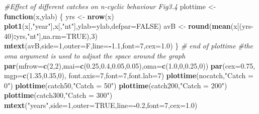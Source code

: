 \documentclass[
  lang=cn,
  11pt,
  scheme=chinese,
  chinesefont=nofont,
  citestyle=gb7714-2015,
  bibstyle=gb7714-2015]{elegantbook}
\newenvironment{Shaded}{\begin{snugshade}}{\end{snugshade}}
\newcommand{\AttributeTok}[1]{\textcolor[rgb]{0.13,0.29,0.53}{#1}}
\newcommand{\CommentTok}[1]{\textcolor[rgb]{0.56,0.35,0.01}{\textit{#1}}}
\newcommand{\ConstantTok}[1]{\textcolor[rgb]{0.56,0.35,0.01}{#1}}
\newcommand{\ControlFlowTok}[1]{\textcolor[rgb]{0.13,0.29,0.53}{\textbf{#1}}}
\newcommand{\DecValTok}[1]{\textcolor[rgb]{0.00,0.00,0.81}{#1}}
\newcommand{\FloatTok}[1]{\textcolor[rgb]{0.00,0.00,0.81}{#1}}
\newcommand{\FunctionTok}[1]{\textcolor[rgb]{0.13,0.29,0.53}{\textbf{#1}}}
\newcommand{\NormalTok}[1]{#1}
\newcommand{\OtherTok}[1]{\textcolor[rgb]{0.56,0.35,0.01}{#1}}
\newcommand{\SpecialCharTok}[1]{\textcolor[rgb]{0.81,0.36,0.00}{\textbf{#1}}}
\newcommand{\StringTok}[1]{\textcolor[rgb]{0.31,0.60,0.02}{#1}}
\begin{document}
\begin{Shaded}
\begin{Highlighting}[]
 \CommentTok{\#Effect of different catches on n{-}cyclic behaviour Fig3.4  }
\NormalTok{plottime }\OtherTok{\textless{}{-}} \ControlFlowTok{function}\NormalTok{(x,ylab) \{  }
\NormalTok{   yrs }\OtherTok{\textless{}{-}} \FunctionTok{nrow}\NormalTok{(x)  }
   \FunctionTok{plot1}\NormalTok{(x[,}\StringTok{"year"}\NormalTok{],x[,}\StringTok{"nt"}\NormalTok{],}\AttributeTok{ylab=}\NormalTok{ylab,}\AttributeTok{defpar=}\ConstantTok{FALSE}\NormalTok{)  }
\NormalTok{   avB }\OtherTok{\textless{}{-}} \FunctionTok{round}\NormalTok{(}\FunctionTok{mean}\NormalTok{(x[(yrs}\DecValTok{{-}40}\NormalTok{)}\SpecialCharTok{:}\NormalTok{yrs,}\StringTok{"nt"}\NormalTok{],}\AttributeTok{na.rm=}\ConstantTok{TRUE}\NormalTok{),}\DecValTok{3}\NormalTok{)  }
   \FunctionTok{mtext}\NormalTok{(avB,}\AttributeTok{side=}\DecValTok{1}\NormalTok{,}\AttributeTok{outer=}\NormalTok{F,}\AttributeTok{line=}\SpecialCharTok{{-}}\FloatTok{1.1}\NormalTok{,}\AttributeTok{font=}\DecValTok{7}\NormalTok{,}\AttributeTok{cex=}\FloatTok{1.0}\NormalTok{)   }
\NormalTok{\} }\CommentTok{\# end of plottime  }
 \CommentTok{\#the oma argument is used to adjust the space around the graph  }
\FunctionTok{par}\NormalTok{(}\AttributeTok{mfrow=}\FunctionTok{c}\NormalTok{(}\DecValTok{2}\NormalTok{,}\DecValTok{2}\NormalTok{),}\AttributeTok{mai=}\FunctionTok{c}\NormalTok{(}\FloatTok{0.25}\NormalTok{,}\FloatTok{0.4}\NormalTok{,}\FloatTok{0.05}\NormalTok{,}\FloatTok{0.05}\NormalTok{),}\AttributeTok{oma=}\FunctionTok{c}\NormalTok{(}\FloatTok{1.0}\NormalTok{,}\DecValTok{0}\NormalTok{,}\FloatTok{0.25}\NormalTok{,}\DecValTok{0}\NormalTok{))   }
\FunctionTok{par}\NormalTok{(}\AttributeTok{cex=}\FloatTok{0.75}\NormalTok{, }\AttributeTok{mgp=}\FunctionTok{c}\NormalTok{(}\FloatTok{1.35}\NormalTok{,}\FloatTok{0.35}\NormalTok{,}\DecValTok{0}\NormalTok{), }\AttributeTok{font.axis=}\DecValTok{7}\NormalTok{,}\AttributeTok{font=}\DecValTok{7}\NormalTok{,}\AttributeTok{font.lab=}\DecValTok{7}\NormalTok{)    }
\FunctionTok{plottime}\NormalTok{(nocatch,}\StringTok{"Catch = 0"}\NormalTok{)  }
\FunctionTok{plottime}\NormalTok{(catch50,}\StringTok{"Catch = 50"}\NormalTok{)  }
\FunctionTok{plottime}\NormalTok{(catch200,}\StringTok{"Catch = 200"}\NormalTok{)  }
\FunctionTok{plottime}\NormalTok{(catch300,}\StringTok{"Catch = 300"}\NormalTok{)  }
\FunctionTok{mtext}\NormalTok{(}\StringTok{"years"}\NormalTok{,}\AttributeTok{side=}\DecValTok{1}\NormalTok{,}\AttributeTok{outer=}\ConstantTok{TRUE}\NormalTok{,}\AttributeTok{line=}\SpecialCharTok{{-}}\FloatTok{0.2}\NormalTok{,}\AttributeTok{font=}\DecValTok{7}\NormalTok{,}\AttributeTok{cex=}\FloatTok{1.0}\NormalTok{)   }
\end{Highlighting}
\end{Shaded}
\end{document}
